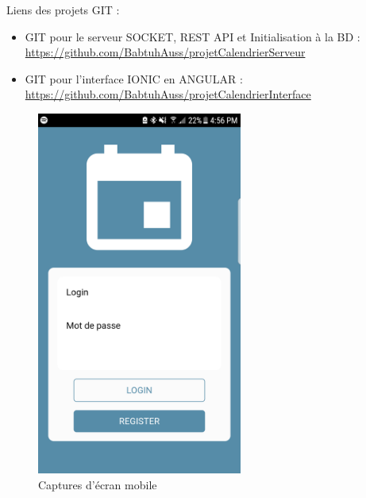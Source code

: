 
Liens des projets GIT :\\

\begin{itemize}
    \item GIT pour le serveur SOCKET, REST API et Initialisation à la BD :\\
    \url{https://github.com/BabtuhAuss/projetCalendrierServeur}
    \item GIT pour l'interface IONIC en ANGULAR :\\ \url{https://github.com/BabtuhAuss/projetCalendrierInterface}
\end{itemize}

\vfill

\begin{figure}[H]
    \centering
    \includegraphics[height=12cm]{Annexe/1.png}
    \caption{Captures d'écran mobile}
    \label{fig:my_label}
\end{figure}

\insertScreenshot
